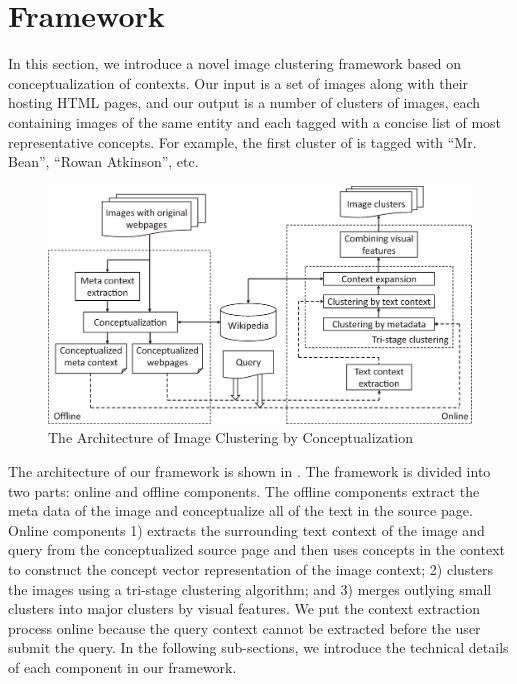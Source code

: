 \section{Framework}
\label{sec:algo}


In this section, we introduce a novel image clustering framework
based on conceptualization of contexts.
Our input is a set of images along with their hosting HTML pages,
and our output is a number of clusters of images, each containing images
of the same entity and each tagged with a concise list of
most representative concepts. For example, the first
cluster of  is tagged with ``Mr. Bean'', ``Rowan Atkinson'', etc.


\begin{figure}[th]
\begin{center}
\centering
\includegraphics[width=\columnwidth]{framework.eps}
\caption{The Architecture of Image Clustering by Conceptualization}
\label{fig:frame}
\end{center}
\end{figure}

The architecture of our framework is shown in .
The framework is divided into two parts: online and offline components.
The offline components extract the meta data of the image and
conceptualize all of the text in the source page. Online components 1) extracts
the surrounding text context of the image and query from the conceptualized source page and
then uses concepts in the context to construct the concept vector
representation of the image context; 2) clusters the images using
a tri-stage clustering algorithm; and 3) merges outlying small clusters
into major clusters by visual features. We put the context extraction process
online because the query context cannot be extracted before the user
submit the query. In the following sub-sections, we introduce the technical
details of each component in our framework.

